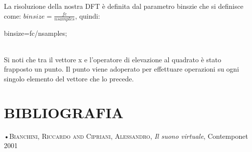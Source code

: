 \documentclass[11pt]{article}
\begin{document}
\begin{multicols*}{2}
La risoluzione della nostra DFT è definita dal parametro binszie che si definisce come: $binsize = \frac{fc}{nsamples}$, quindi:

 \begin{center}
\begin{minipage}[c]{6.2cm}
\begin{sffamily}
\scriptsize

binsize=fc/nsamples;\\

\end{sffamily}
\end{minipage}
\end{center}\\


Si noti che tra il vettore x e l’operatore di elevazione al quadrato è stato frapposto un punto. Il punto viene adoperato per effettuare operazioni su ogni singolo elemento del vettore che lo precede.

\section*{\centering\small{BIBLIOGRAFIA}}
•\textsc{\textsf {Bianchini, Riccardo and Cipriani, Alessandro}}, \emph{Il suono virtuale}, Contemponet 2001\\

\end{multicols*}
\end{document}
